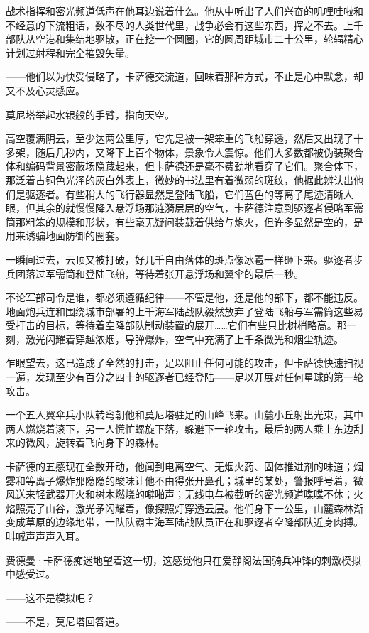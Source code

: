 \documentclass[AutoFakeBold=true]{book}
\begin{document}
战术指挥和密光频道低声在他耳边说着什么。他从中听出了人们兴奋的叽哩哇啦和不经意的下流粗话，数不尽的人类世代里，战争必会有这些东西，挥之不去。上千部队从空港和集结地驱散，正在挖一个圆圈，它的圆周距城市二十公里，轮辐精心计划过射程和完全摧毁矢量。

{\kaishu ——他们以为快受侵略了}，卡萨德交流道，回味着那种方式，不止是心中默念，却又不及心灵感应。

莫尼塔举起水银般的手臂，指向天空。

高空覆满阴云，至少达两公里厚，它先是被一架笨重的飞船穿透，然后又出现了十多架，随后几秒内，又降下上百个物体，景象令人震惊。他们大多数都被伪装聚合体和编码背景密蔽场隐藏起来，但卡萨德还是毫不费劲地看穿了它们。聚合体下，那泛着古铜色光泽的灰白外表上，微妙的书法里有着微弱的斑纹，他据此辨认出他们是驱逐者。有些稍大的飞行器显然是登陆飞船，它们蓝色的等离子尾迹清晰人眼，但其余的就慢慢降入悬浮场那涟漪层层的空气，卡萨德注意到驱逐者侵略军需筒那粗笨的规模和形状，有些毫无疑问装载着供给与炮火，但许多显然是空的，是用来诱骗地面防御的圈套。

一瞬间过去，云顶又被打破，好几千自由落体的斑点像冰雹一样砸下来。驱逐者步兵团落过军需筒和登陆飞船，等待着张开悬浮场和翼伞的最后一秒。

不论军部司令是谁，都必须遵循纪律——不管是他，还是他的部下，都不能违反。地面炮兵连和围绕城市部署的上千海军陆战队毅然放弃了登陆飞船与军需筒这些易受打击的目标，等待着空降部队制动装置的展开……它们有些只比树梢略高。那一刻，激光闪耀着穿越浓烟，导弹爆炸，空气中充满了上千条微光和烟尘轨迹。

乍眼望去，这已造成了全然的打击，足以阻止任何可能的攻击，但卡萨德快速扫视一遍，发现至少有百分之四十的驱逐者已经登陆——足以开展对任何星球的第一轮攻击。

一个五人翼伞兵小队转弯朝他和莫尼塔驻足的山峰飞来。山麓小丘射出光束，其中两人燃烧着滚下，另一人慌忙螺旋下落，躲避下一轮攻击，最后的两人乘上东边刮来的微风，旋转着飞向身下的森林。

卡萨德的五感现在全数开动，他闻到电离空气、无烟火药、固体推进剂的味道；烟雾和等离子爆炸那隐隐的酸味让他不由得张开鼻孔；城里的某处，警报呼号着，微风送来轻武器开火和树木燃烧的噼啪声；无线电与被截听的密光频道喋喋不休；火焰照亮了山谷，激光矛闪耀着，像探照灯穿透云层。他们身下一公里，山麓森林渐变成草原的边缘地带，一队队霸主海军陆战队员正在和驱逐者空降部队近身肉搏。叫喊声声声入耳。

费德曼·卡萨德痴迷地望着这一切，这感觉他只在爱静阁法国骑兵冲锋的刺激模拟中感受过。

{\kaishu ——这不是模拟吧？}

{\kaishu ——不是}，莫尼塔回答道。
\end{document}
